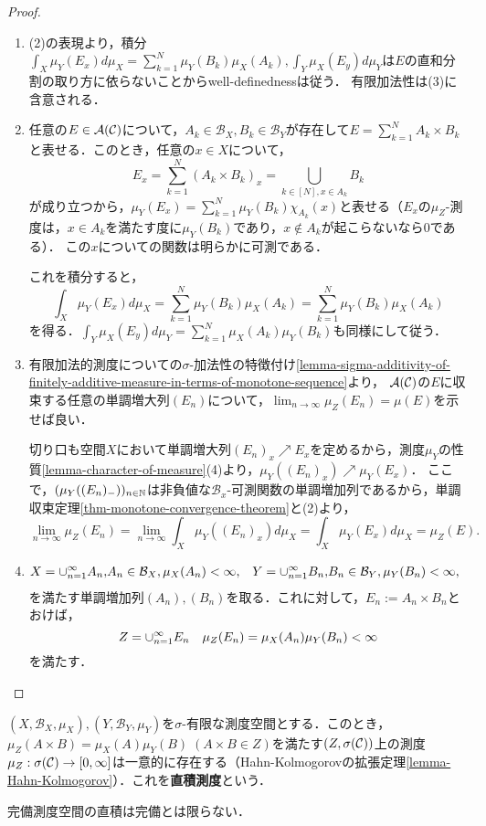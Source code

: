 \documentclass[uplatex, dvipdfmx]{jsreport}
\renewcommand{\B}{\mathcal{B}}
\begin{document}
\begin{proof}\mbox{}
    \begin{enumerate}
        \item (2)の表現より，積分$\int_X\mu_Y(E_x)d\mu_X=\sum_{k=1}^N\mu_Y(B_k)\mu_X(A_k),\int_Y\mu_X(E_y)d\mu_Y$は$E$の直和分割の取り方に依らないことからwell-definednessは従う．
        有限加法性は(3)に含意される．
        \item 任意の$E\in\mathcal{A}(\mathcal{C})$について，$A_k\in\B_X,B_k\in\B_Y$が存在して$E=\sum_{k=1}^NA_k\times B_k$と表せる．このとき，任意の$x\in X$について，
        \[E_x=\sum^N_{k=1}(A_k\times B_k)_x=\bigcup_{k\in[N],x\in A_k}B_k\]
        が成り立つから，$\mu_Y(E_x)=\sum_{k=1}^N\mu_Y(B_k)\chi_{A_k}(x)$と表せる（$E_x$の$\mu_Z$-測度は，$x\in A_k$を満たす度に$\mu_Y(B_k)$であり，$x\notin A_k$が起こらないなら$0$である）．
        この$x$についての関数は明らかに可測である．

        これを積分すると，
        \[\int_X\mu_Y(E_x)d\mu_X=\sum_{k=1}^N\mu_Y(B_k)\mu_X(A_k)=\sum_{k=1}^N\mu_Y(B_k)\mu_X(A_k)\]
        を得る．$\int_Y\mu_X(E_y)d\mu_Y=\sum_{k=1}^N\mu_X(A_k)\mu_Y(B_k)$も同様にして従う．
        \item 
        有限加法的測度についての$\sigma$-加法性の特徴付け\ref{lemma-sigma-additivity-of-finitely-additive-measure-in-terms-of-monotone-sequence}より，
        $\mathcal{A}(\mathcal{C})$の$E$に収束する任意の単調増大列$(E_n)$について，$\lim_{n\to\infty}\mu_Z(E_n)=\mu(E)$を示せば良い．

        切り口も空間$X$において単調増大列$(E_n)_x\nearrow E_x$を定めるから，測度$\mu_Y$の性質\ref{lemma-character-of-measure}(4)より，$\mu_Y((E_n)_x)\nearrow\mu_Y(E_x)$．
        ここで，$(\mu_Y((E_n)_-))_{n\in\mathbb{N}}$は非負値な$\B_x$-可測関数の単調増加列であるから，単調収束定理\ref{thm-monotone-convergence-theorem}と(2)より，
        \[\lim_{n\to\infty}\mu_Z(E_n)=\lim_{n\to\infty}\int_X\mu_Y((E_n)_x)d\mu_X=\int_X\mu_Y(E_x)d\mu_X=\mu_Z(E).\]
        \item 
        \begin{align*}
            X=\cupn A_n,&A_n\in\B_X,\mu_X(A_n)<\infty,&Y=\cupn B_n,&B_n\in\B_Y,\mu_Y(B_n)<\infty,
        \end{align*}
        を満たす単調増加列$(A_n),(B_n)$を取る．これに対して，$E_n:=A_n\times B_n$とおけば，
        \[Z=\cup_{n=1}^\infty E_n\quad\mu_Z(E_n)=\mu_X(A_n)\mu_Y(B_n)<\infty\]
        を満たす．
    \end{enumerate}
\end{proof}

\begin{definition}
    $(X,\B_X,\mu_X),(Y,\B_Y,\mu_Y)$を$\sigma$-有限な測度空間とする．このとき，$\mu_Z(A\times B)=\mu_X(A)\mu_Y(B)\;(A\times B\in Z)$を満たす$(Z,\sigma(\mathcal{C}))$上の測度$\mu_Z:\sigma(\mathcal{C})\to[0,\infty]$は一意的に存在する（Hahn-Kolmogorovの拡張定理\ref{lemma-Hahn-Kolmogorov}）．これを\textbf{直積測度}という．
\end{definition}
\begin{remark}
    完備測度空間の直積は完備とは限らない．
\end{remark}
\end{document}
